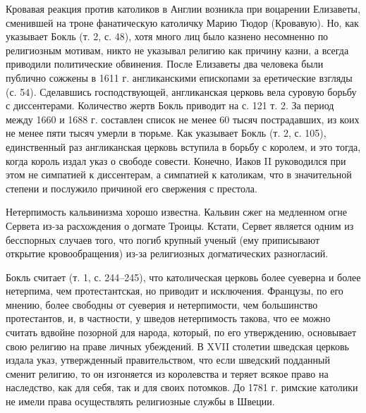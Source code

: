 Кровавая реакция против католиков в Англии возникла при воцарении Елизаветы,
сменившей на троне фанатическую католичку Марию Тюдор (Кровавую). Но, как
указывает Бокль (т. 2, с. 48), хотя много лиц было казнено несомненно по
религиозным мотивам, никто не указывал религию как причину казни, а всегда
приводили политические обвинения. После Елизаветы два человека были публично
сожжены в 1611 г. англиканскими епископами за еретические взгляды (с. 54).
Сделавшись господствующей, англиканская церковь вела суровую борьбу с
диссентерами. Количество жертв Бокль приводит на с. 121 т. 2. За период между
1660 и 1688 г. составлен список не менее 60 тысяч пострадавших, из коих не
менее пяти тысяч умерли в тюрьме. Как указывает Бокль (т. 2, с. 105),
единственный раз англиканская церковь вступила в борьбу с королем, и это тогда,
когда король издал указ о свободе совести. Конечно, Иаков II руководился при
этом не симпатией к диссентерам, а симпатией к католикам, что в значительной
степени и послужило причиной его свержения с престола.

Нетерпимость кальвинизма хорошо известна. Кальвин сжег на медленном огне
Сервета из-за расхождения о догмате Троицы. Кстати, Сервет является одним из
бесспорных случаев того, что погиб крупный ученый (ему приписывают открытие
кровообращения) из-за религиозных догматических разногласий.

Бокль считает (т. 1, с. 244--245), что католическая церковь более суеверна и
более нетерпима, чем протестантская, но приводит и исключения. Французы, по его
мнению, более свободны от суеверия и нетерпимости, чем большинство
протестантов, и, в частности, у шведов нетерпимость такова, что ее можно
считать вдвойне позорной для народа, который, по его утверждению, основывает
свою религию на праве личных убеждений. В XVII столетии шведская церковь издала
указ, утвержденный правительством, что если шведский подданный сменит религию,
то он изгоняется из королевства и теряет всякое право на наследство, как для
себя, так и для своих потомков. До 1781 г. римские католики не имели права
осуществлять религиозные службы в Швеции.

